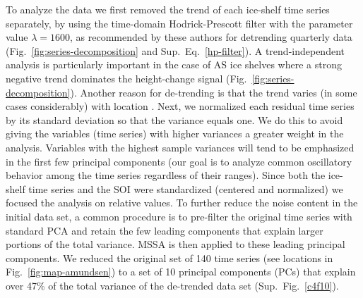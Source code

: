 To analyze the data we first removed the trend of each ice-shelf time series separately, by using the time-domain Hodrick-Prescott filter \parencite{Hodrick1997} with the parameter value $\lambda= 1600$, as recommended by these authors for detrending quarterly data (Fig.~\ref{fig:series-decomposition} and Sup.~Eq.~\ref{hp-filter}). A trend-independent analysis is particularly important in the case of AS ice shelves where a strong negative trend dominates the height-change signal (Fig.~\ref{fig:series-decomposition}). Another reason for de-trending is that the trend varies (in some cases considerably) with location \parencite{Paolo2015, Pritchard2012, Shepherd2010}. Next, we normalized each residual time series by its standard deviation so that the variance equals one. We do this to avoid giving the variables (time series) with higher variances a greater weight in the analysis. Variables with the highest sample variances will tend to be emphasized in the first few principal components (our goal is to analyze common oscillatory behavior among the time series regardless of their ranges). Since both the ice-shelf time series and the SOI were standardized (centered and normalized) we focused the analysis on relative values. To further reduce the noise content in the initial data set, a common procedure is to pre-filter the original time series with standard PCA and retain the few leading components that explain larger portions of the total variance. MSSA is then applied to these leading principal components. We reduced the original set of 140 time series (see locations in Fig.~\ref{fig:map-amundsen}) to a set of 10 principal components (PCs) that explain over 47\% of the total variance of the de-trended data set (Sup.~Fig.~\ref{c4f10}).



